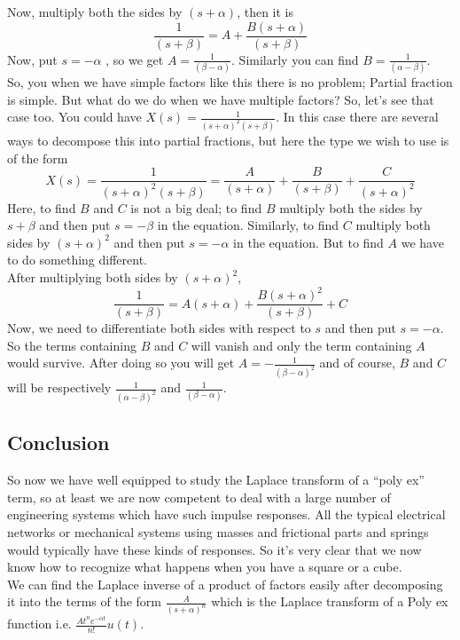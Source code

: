 Now, multiply both the sides by $(s+\alpha)$, then it is
\[
\frac{1}{(s+\beta)} = A + \frac{B(s+\alpha)}{(s+\beta)}
\]
Now, put $s = - \alpha$ , so we get $A = \frac{1}{(\beta-\alpha)}$. Similarly you can find $ B = \frac{1}{(\alpha-\beta)}$.\\

So, you when we have simple factors like this there is no problem; Partial fraction is simple. But what do we do when we have multiple factors? So, let’s see that case too.
You could have $X(s) = \frac{1}{(s+\alpha)^2(s+\beta)}$. In this case there are several ways to decompose this into partial fractions, but here the type we wish to use is of the form
\[
X(s) = \frac{1}{(s+\alpha)^2(s+\beta)} = \frac{A}{(s+\alpha)} + \frac{B}{(s+\beta)} + \frac{C}{(s+\alpha)^2}
\]
Here, to find $B$ and $C$ is not a big deal; to find $B$ multiply both the sides by $s+\beta$ and then put $s = - \beta$ in the equation. Similarly, to find $C$ multiply both sides by $(s+\alpha)^2$ and then put $s = -\alpha$ in the equation. But to find $A$ we have to do something different.\\

After multiplying both sides by $(s+\alpha)^2$,
\[
\frac{1}{(s+\beta)} = A(s+\alpha) + \frac{B(s+\alpha)^2}{(s+\beta)}+C
\]
Now, we need to differentiate both sides with respect to $s$ and then put $s = -\alpha$. So the terms containing $B$ and $C$ will vanish and only the term containing $A$ would survive. After doing so you will get $A = -\frac{1}{(\beta-\alpha)^2}$ and of course, $B$ and $C$ will be respectively $\frac{1}{(\alpha-\beta)^2}$  and $\frac{1}{(\beta-\alpha)}$.

\subsection{Conclusion}
So now we have well equipped to study the Laplace transform of a “poly ex” term, so at least we are now competent to deal with a large number of engineering systems which have such impulse responses. All the typical electrical networks or mechanical systems using masses and frictional parts and springs would typically have these kinds of responses. So it's very clear that we now know how to recognize what happens when you have a square or a cube.\\
We can find the Laplace inverse of a product of factors easily after decomposing it into the terms of the form $\frac{A}{(s+\alpha)^n}$ which is the Laplace transform of a Poly ex function i.e. $\frac{A t^n e^{-\alpha t}}{n!}  u(t)$.
